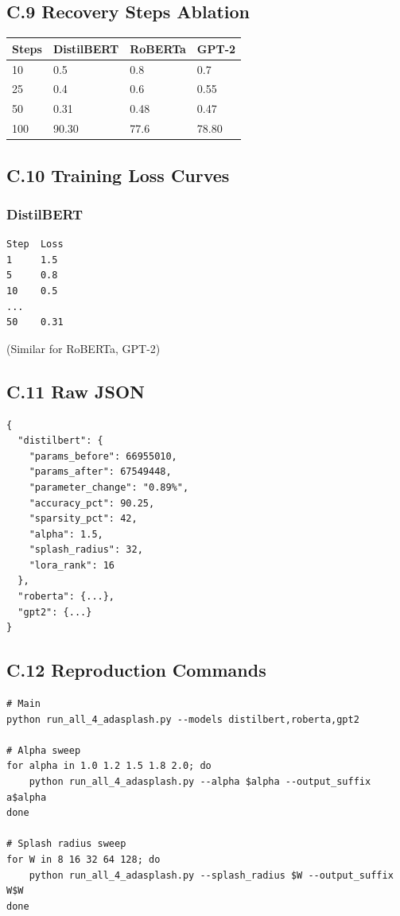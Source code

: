 \subsection{C.9 Recovery Steps Ablation}

\begin{table}[H]
\centering
\small
\begin{tabular}{llll}
\toprule
\textbf{Steps} & \textbf{DistilBERT} & \textbf{RoBERTa} & \textbf{GPT-2} \\
\midrule
10 & 0.5 & 0.8 & 0.7 \\
25 & 0.4 & 0.6 & 0.55 \\
50 & 0.31 & 0.48 & 0.47 \\
100 & 90.30 & 77.6 & 78.80 \\
\bottomrule
\end{tabular}
\end{table}

\subsection{C.10 Training Loss Curves}

\subsubsection{DistilBERT}
\begin{lstlisting}
Step  Loss
1     1.5
5     0.8
10    0.5
...
50    0.31
\end{lstlisting}

(Similar for RoBERTa, GPT-2)

\subsection{C.11 Raw JSON}

\begin{lstlisting}
{
  "distilbert": {
    "params_before": 66955010,
    "params_after": 67549448,
    "parameter_change": "0.89%",
    "accuracy_pct": 90.25,
    "sparsity_pct": 42,
    "alpha": 1.5,
    "splash_radius": 32,
    "lora_rank": 16
  },
  "roberta": {...},
  "gpt2": {...}
}
\end{lstlisting}

\subsection{C.12 Reproduction Commands}

\begin{lstlisting}
# Main
python run_all_4_adasplash.py --models distilbert,roberta,gpt2

# Alpha sweep
for alpha in 1.0 1.2 1.5 1.8 2.0; do
    python run_all_4_adasplash.py --alpha $alpha --output_suffix a$alpha
done

# Splash radius sweep
for W in 8 16 32 64 128; do
    python run_all_4_adasplash.py --splash_radius $W --output_suffix W$W
done
\end{lstlisting}